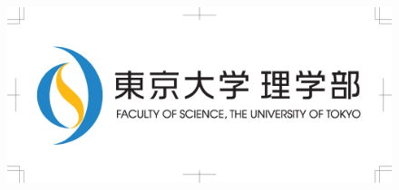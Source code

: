 \documentclass[12pt, a4j, dvipdfmx, jis2004]{jsarticle}
\begin{document}
\begin{figure}[H]
\centering
\includegraphics[width=0.7\linewidth, trim = 50 50 50 50, clip]{science.eps}
\end{figure}
\end{document}
